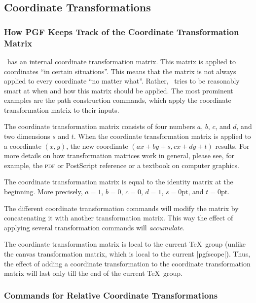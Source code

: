 \subsection{Coordinate Transformations}
\label{section-linear-coordinate-transformations}

\subsubsection{How PGF Keeps Track of the Coordinate Transformation Matrix}
\label{section-transform-cm}

\pgfname\ has an internal coordinate transformation matrix. This matrix is
applied to coordinates ``in certain situations''. This means that the matrix is
not always applied to every coordinate ``no matter what''. Rather, \pgfname\
tries to be reasonably smart at when and how this matrix should be applied. The
most prominent examples are the path construction commands, which apply the
coordinate transformation matrix to their inputs.

The coordinate transformation matrix consists of four numbers $a$, $b$, $c$,
and $d$, and two dimensions $s$ and $t$. When the coordinate transformation
matrix is applied to a coordinate $(x,y)$, the new coordinate
$(ax+by+s,cx+dy+t)$ results. For more details on how transformation matrices
work in general, please see, for example, the \textsc{pdf} or PostScript
reference or a textbook on computer graphics.

The coordinate transformation matrix is equal to the identity matrix at the
beginning. More precisely, $a=1$, $b=0$, $c=0$, $d=1$, $s=0\mathrm{pt}$, and
$t=0\mathrm{pt}$.

The different coordinate transformation commands will modify the matrix by
concatenating it with another transformation matrix. This way the effect of
applying several transformation commands will \emph{accumulate}.

The coordinate transformation matrix is local to the current \TeX\ group
(unlike the canvas transformation matrix, which is local to the current
|{pgfscope}|). Thus, the effect of adding a coordinate transformation to the
coordinate transformation matrix will last only till the end of the current
\TeX\ group.


\subsubsection{Commands for Relative Coordinate Transformations}

